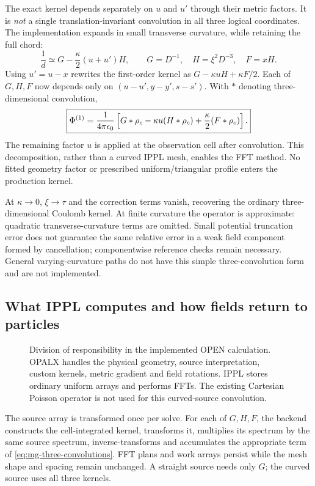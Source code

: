 The exact kernel depends separately on $u$ and $u'$ through their metric
factors. It is \emph{not} a single translation-invariant convolution in all
three logical coordinates. The implementation expands in small transverse
curvature, while retaining the full chord:
\begin{equation}
 \frac1d\simeq G-\frac\kappa2(u+u')H,
 \qquad G=D^{-1},\quad H=\xi^2D^{-3},\quad F=xH.
 \label{eq:mg-expansion}
\end{equation}
Using $u'=u-x$ rewrites the first-order kernel as
$G-\kappa uH+\kappa F/2$. Each of $G,H,F$ now depends only on
$(u-u',y-y',s-s')$. With $*$ denoting three-dimensional convolution,
\begin{equation}
 \boxed{\displaystyle
 \Phi^{(1)}=\frac1{4\pi\epsilon_0}
 \left[G*\rho_c-\kappa u(H*\rho_c)+\frac\kappa2(F*\rho_c)\right].}
 \label{eq:mg-three-convolutions}
\end{equation}
The remaining factor $u$ is applied at the observation cell after convolution.
This decomposition, rather than a curved IPPL mesh, enables the FFT method.
No fitted geometry factor or prescribed uniform/triangular profile enters
the production kernel.

At $\kappa\to0$, $\xi\to\tau$ and the correction terms vanish, recovering
the ordinary three-dimensional Coulomb kernel. At finite curvature the
operator is approximate: quadratic transverse-curvature terms are omitted.
Small potential truncation error does not guarantee the same relative error
in a weak field component formed by cancellation; componentwise reference
checks remain necessary. General varying-curvature paths do not have this
simple three-convolution form and are not implemented.

\clearpage
\subsection{What IPPL computes and how fields return to particles}
\begin{figure}[H]
 \centering
 
 \caption{Division of responsibility in the implemented OPEN calculation.
 OPALX handles the physical geometry, source interpretation, custom kernels,
 metric gradient and field rotations. IPPL stores ordinary uniform arrays
 and performs FFTs. The existing Cartesian Poisson operator is not used for
 this curved-source convolution.}
 \label{fig:mg-pipeline}
\end{figure}

The source array is transformed once per solve. For each of $G,H,F$, the
backend constructs the cell-integrated kernel, transforms it, multiplies its
spectrum by the same source spectrum, inverse-transforms and accumulates the
appropriate term of \cref{eq:mg-three-convolutions}. FFT plans and work arrays
persist while the mesh shape and spacing remain unchanged. A straight source
needs only $G$; the curved source uses all three kernels.

